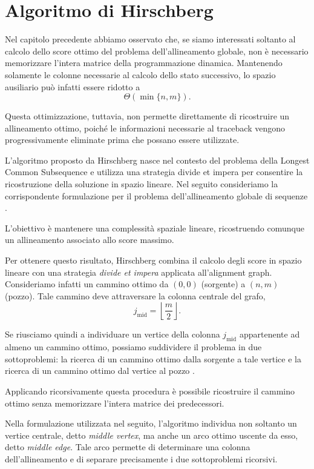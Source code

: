 \section{Algoritmo di Hirschberg}

Nel capitolo precedente abbiamo osservato che, se siamo interessati soltanto al calcolo
dello score ottimo del problema dell'allineamento globale, non è necessario memorizzare
l'intera matrice della programmazione dinamica. Mantenendo solamente le colonne
necessarie al calcolo dello stato successivo, lo spazio ausiliario può infatti essere
ridotto a
\[
    \Theta(\min\{n,m\}).
\]

Questa ottimizzazione, tuttavia, non permette direttamente di ricostruire un
allineamento ottimo, poiché le informazioni necessarie al traceback vengono
progressivamente eliminate prima che possano essere utilizzate.

L'algoritmo proposto da Hirschberg \cite{hirschberg} nasce nel contesto del problema della Longest Common Subsequence e utilizza
una strategia divide et impera per consentire la ricostruzione della soluzione in spazio lineare.
Nel seguito consideriamo la corrispondente formulazione per il problema dell'allineamento globale di sequenze \cite[Sec.~7.2]{jones--pevzner}.

L'obiettivo è mantenere una complessità spaziale lineare, ricostruendo comunque un allineamento associato allo score massimo.

Per ottenere questo risultato, Hirschberg combina il calcolo degli score in spazio
lineare con una strategia \emph{divide et impera} applicata all'alignment graph.
Consideriamo infatti un cammino ottimo da $(0,0)$ (sorgente) a $(n,m)$ (pozzo). Tale cammino deve
attraversare la colonna centrale del grafo,
\[
    j_{\mathrm{mid}} = \left\lfloor\frac{m}{2}\right\rfloor.
\]

Se riusciamo quindi a individuare un vertice della colonna $j_{\mathrm{mid}}$
appartenente ad almeno un cammino ottimo, possiamo suddividere il problema in due
sottoproblemi: la ricerca di un cammino ottimo dalla sorgente a tale vertice e la
ricerca di un cammino ottimo dal vertice al pozzo \cite[pp.~232--234]{jones--pevzner}.

Applicando ricorsivamente questa procedura è possibile ricostruire il cammino
ottimo senza memorizzare l'intera matrice dei predecessori.

Nella formulazione utilizzata nel seguito, l'algoritmo individua non soltanto un
vertice centrale, detto \emph{middle vertex}, ma anche un arco ottimo uscente da
esso, detto \emph{middle edge}. Tale arco permette di determinare una colonna
dell'allineamento e di separare precisamente i due sottoproblemi ricorsivi.

